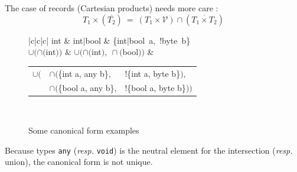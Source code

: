 \documentclass[10pt,a4paper]{article}
\newcommand{\code}{\texttt}
\newcommand{\val}{\mathcal V}
\begin{document}
The case of records (Cartesian products) needs more care :
\[
T_1 \times (\overline{T_2}) ~ = ~ \left(T_1 \times \val \right) \cap \left( \overline{T_1 \times T_2} \right)
\]


\begin{figure}[h]
	\centering
	\begin{tabular}{|c|c|c|}
	\hline
	int & int$|$bool & \{int$|$bool~a,~!byte~b\} \\
	\hline
	$\cup(\cap($int$))$ & $\cup(\cap($int$),~\cap($bool$))$ & 
	\begin{tabular}{lll}
		$\cup($ & $\cap($\{int a, any b\}, & !\{int a, byte b\}$),$ \\
		& $\cap($\{bool a, any b\}, & !\{bool a, byte b\}$))$ 
	\end{tabular} \\
	\hline
	\end{tabular}
	\caption{Some canonical form examples}
\end{figure}

Because types \code{any} (\textit{resp.} \code{void}) is the neutral element for the intersection (\textit{resp.} union), the canonical form is not unique.
\end{document}
